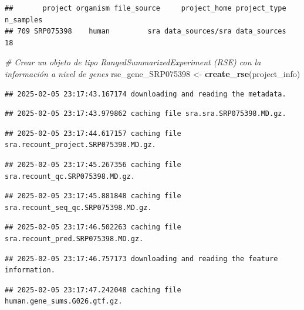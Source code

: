 \documentclass[
]{article}
\newenvironment{Shaded}{\begin{snugshade}}{\end{snugshade}}
\newcommand{\CommentTok}[1]{\textcolor[rgb]{0.56,0.35,0.01}{\textit{#1}}}
\newcommand{\FunctionTok}[1]{\textcolor[rgb]{0.13,0.29,0.53}{\textbf{#1}}}
\newcommand{\NormalTok}[1]{#1}
\newcommand{\OtherTok}[1]{\textcolor[rgb]{0.56,0.35,0.01}{#1}}
\begin{document}
\begin{verbatim}
##       project organism file_source     project_home project_type n_samples
## 709 SRP075398    human         sra data_sources/sra data_sources        18
\end{verbatim}

\begin{Shaded}
\begin{Highlighting}[]
\CommentTok{\# Crear un objeto de tipo RangedSummarizedExperiment (RSE) con la información a nivel de genes}
\NormalTok{rse\_gene\_SRP075398 }\OtherTok{\textless{}{-}} \FunctionTok{create\_rse}\NormalTok{(project\_info)}
\end{Highlighting}
\end{Shaded}

\begin{verbatim}
## 2025-02-05 23:17:43.167174 downloading and reading the metadata.
\end{verbatim}

\begin{verbatim}
## 2025-02-05 23:17:43.979862 caching file sra.sra.SRP075398.MD.gz.
\end{verbatim}

\begin{verbatim}
## 2025-02-05 23:17:44.617157 caching file sra.recount_project.SRP075398.MD.gz.
\end{verbatim}

\begin{verbatim}
## 2025-02-05 23:17:45.267356 caching file sra.recount_qc.SRP075398.MD.gz.
\end{verbatim}

\begin{verbatim}
## 2025-02-05 23:17:45.881848 caching file sra.recount_seq_qc.SRP075398.MD.gz.
\end{verbatim}

\begin{verbatim}
## 2025-02-05 23:17:46.502263 caching file sra.recount_pred.SRP075398.MD.gz.
\end{verbatim}

\begin{verbatim}
## 2025-02-05 23:17:46.757173 downloading and reading the feature information.
\end{verbatim}

\begin{verbatim}
## 2025-02-05 23:17:47.242048 caching file human.gene_sums.G026.gtf.gz.
\end{verbatim}
\end{document}
